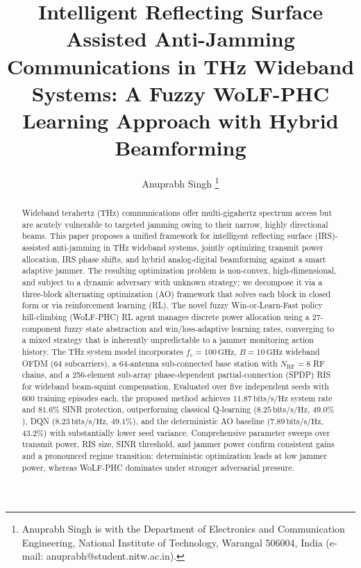 \documentclass[journal,twocolumn]{IEEEtran}
\begin{document}

\title{Intelligent Reflecting Surface Assisted Anti-Jamming Communications in THz Wideband Systems: A Fuzzy WoLF-PHC Learning Approach with Hybrid Beamforming}

\author{Anuprabh Singh%
\thanks{Anuprabh Singh is with the Department of Electronics and Communication Engineering, National Institute of Technology, Warangal 506004, India (e-mail: anuprabh@student.nitw.ac.in).}}

\maketitle


\begin{abstract}
Wideband terahertz (THz) communications offer multi-gigahertz spectrum access but are acutely vulnerable to targeted jamming owing to their narrow, highly directional beams. This paper proposes a unified framework for intelligent reflecting surface (IRS)-assisted anti-jamming in THz wideband systems, jointly optimizing transmit power allocation, IRS phase shifts, and hybrid analog-digital beamforming against a smart adaptive jammer. The resulting optimization problem is non-convex, high-dimensional, and subject to a dynamic adversary with unknown strategy; we decompose it via a three-block alternating optimization (AO) framework that solves each block in closed form or via reinforcement learning (RL). The novel fuzzy Win-or-Learn-Fast policy hill-climbing (WoLF-PHC) RL agent manages discrete power allocation using a 27-component fuzzy state abstraction and win/loss-adaptive learning rates, converging to a mixed strategy that is inherently unpredictable to a jammer monitoring action history. The THz system model incorporates $f_c=100\,\text{GHz}$, $B=10\,\text{GHz}$ wideband OFDM (64 subcarriers), a 64-antenna sub-connected base station with $N_\mathrm{RF}=8$ RF chains, and a 256-element sub-array phase-dependent partial-connection (SPDP) RIS for wideband beam-squint compensation. Evaluated over five independent seeds with 600 training episodes each, the proposed method achieves $11.87\,\text{bits/s/Hz}$ system rate and $81.6\%$ SINR protection, outperforming classical Q-learning ($8.25\,\text{bits/s/Hz}$, $49.0\%$), DQN ($8.23\,\text{bits/s/Hz}$, $49.1\%$), and the deterministic AO baseline ($7.89\,\text{bits/s/Hz}$, $43.2\%$) with substantially lower seed variance. Comprehensive parameter sweeps over transmit power, RIS size, SINR threshold, and jammer power confirm consistent gains and a pronounced regime transition: deterministic optimization leads at low jammer power, whereas WoLF-PHC dominates under stronger adversarial pressure.
\end{abstract}
\end{document}
